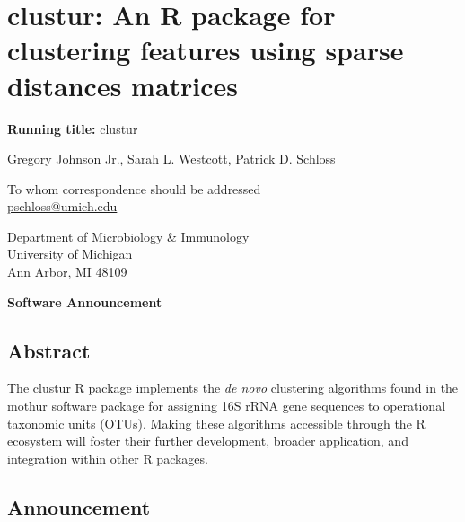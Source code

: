 \documentclass[
  11pt,
]{article}
\author{}
\date{}
\begin{document}
\raggedright

\section{clustur: An R package for clustering features using sparse
distances
matrices}\label{clustur-an-r-package-for-clustering-features-using-sparse-distances-matrices}

\vspace{20mm}

\textbf{Running title:} clustur

\vspace{20mm}

Gregory Johnson Jr.\text, Sarah L. Westcott, Patrick D.
Schloss\textsuperscript{\textdagger}

\vspace{25mm}

\textdagger To whom correspondence should be addressed\\
\href{mailto:pschloss@umich.edu}{pschloss@umich.edu}

\vspace{10mm}

Department of Microbiology \& Immunology\\
University of Michigan\\
Ann Arbor, MI 48109

\vspace{20mm}

\textbf{Software Announcement}

\newpage

\subsection{Abstract}\label{abstract}

The clustur R package implements the \emph{de novo} clustering
algorithms found in the mothur software package for assigning 16S rRNA
gene sequences to operational taxonomic units (OTUs). Making these
algorithms accessible through the R ecosystem will foster their further
development, broader application, and integration within other R
packages.

\newpage

\subsection{Announcement}\label{announcement}
\end{document}
